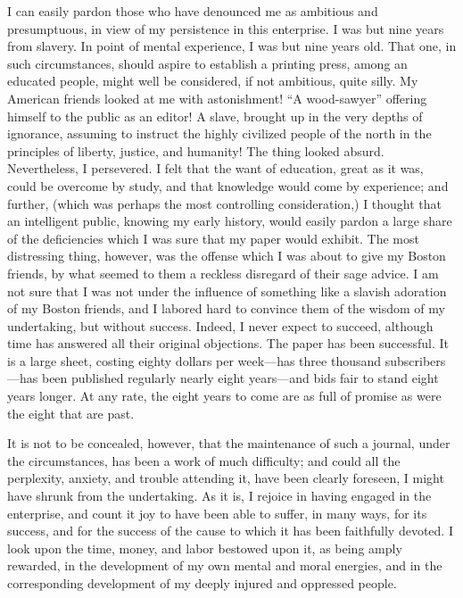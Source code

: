I can easily pardon those who have denounced me
{\protect\hypertarget{394}{}{}}as ambitious and presumptuous, in view of
my persistence in this enterprise. I was but nine years from slavery. In
point of mental experience, I was but nine years old. That one, in such
circumstances, should aspire to establish a printing press, among an
educated people, might well be considered, if not ambitious, quite
silly. My American friends looked at me with astonishment! ``A
wood-sawyer'' offering himself to the public as an editor! A slave,
brought up in the very depths of ignorance, assuming to instruct the
highly civilized people of the north in the principles of liberty,
justice, and humanity! The thing looked absurd. Nevertheless, I
persevered. I felt that the want of education, great as it was, could be
overcome by study, and that knowledge would come by experience; and
further, (which was perhaps the most controlling consideration,) I
thought that an intelligent public, knowing my early history, would
easily pardon a large share of the deficiencies which I was sure that my
paper would exhibit. The most distressing thing, however, was the
offense which I was about to give my Boston friends, by what seemed to
them a reckless disregard of their sage advice. I am not sure that I was
not under the influence of something like a slavish adoration of my
Boston friends, and I labored hard to convince them of the wisdom of my
undertaking, but without success. Indeed, I never expect to succeed,
although time has answered all their original objections. The paper has
been successful. It is a large sheet, costing eighty dollars per
week---has three thousand subscribers---has been published regularly
nearly eight {\protect\hypertarget{395}{}{}}years---and bids fair to
stand eight years longer. At any rate, the eight years to come are as
full of promise as were the eight that are past.

It is not to be concealed, however, that the maintenance of such a
journal, under the circumstances, has been a work of much difficulty;
and could all the perplexity, anxiety, and trouble attending it, have
been clearly foreseen, I might have shrunk from the undertaking. As it
is, I rejoice in having engaged in the enterprise, and count it joy to
have been able to suffer, in many ways, for its success, and for the
success of the cause to which it has been faithfully devoted. I look
upon the time, money, and labor bestowed upon it, as being amply
rewarded, in the development of my own mental and moral energies, and in
the corresponding development of my deeply injured and oppressed people.

